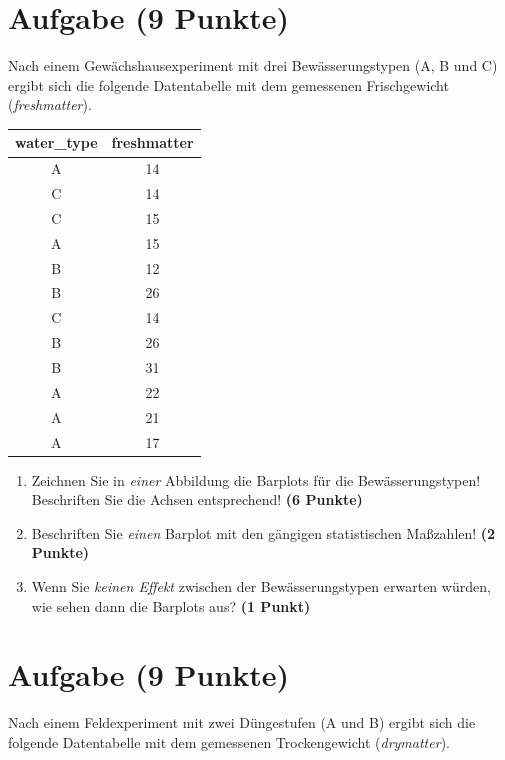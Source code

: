 \documentclass[a4paper, 10pt]{scrartcl}\usepackage[]{graphicx}\usepackage[]{xcolor}
\begin{document}
\section{Aufgabe \hfill (9 Punkte)}

Nach einem Gew{\"a}chshausexperiment mit drei Bew{\"a}sserungstypen (A, B und C) ergibt sich die
folgende Datentabelle mit dem gemessenen Frischgewicht (\textit{freshmatter}). 

\begin{table}[!h]
\centering
\begin{tabular}{cc}
\toprule
water\_type & freshmatter\\
\midrule
A & 14\\
C & 14\\
C & 15\\
A & 15\\
B & 12\\
\addlinespace
B & 26\\
C & 14\\
B & 26\\
B & 31\\
A & 22\\
\addlinespace
A & 21\\
A & 17\\
\bottomrule
\end{tabular}
\end{table}



\begin{enumerate}
\item Zeichnen Sie in \textit{einer} Abbildung die Barplots f{\"u}r die
  Bew{\"a}sserungstypen! Beschriften Sie die Achsen entsprechend!
  \textbf{(6 Punkte)}
\item Beschriften Sie \textit{einen} Barplot mit den g{\"a}ngigen
  statistischen Ma{\ss}zahlen! \textbf{(2 Punkte)}
\item Wenn Sie \textit{keinen Effekt} zwischen der Bew{\"a}sserungstypen erwarten
  w{\"u}rden, wie sehen dann die Barplots aus? \textbf{(1 Punkt)}
\end{enumerate} 
\clearpage

\section{Aufgabe \hfill (9 Punkte)}

Nach einem Feldexperiment mit zwei D{\"u}ngestufen (A und B) ergibt sich die
folgende Datentabelle mit dem gemessenen Trockengewicht (\textit{drymatter}). 
\end{document}
